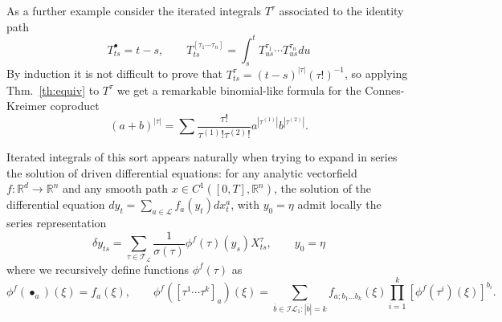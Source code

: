 \documentclass[a4paper]{article}
\newcommand{\ol}[1]{\overline{#1}}
\newcommand{\1}{{\bf 1}}
\newcommand{\II}{\mathcal{I}}
\newcommand{\der}{\delta}
\newcommand{\RR}{\mathbb{R}}
\newcommand{\FF}{\mathcal{F}}
\newcommand{\LL}{\mathcal{L}}
\newcommand{\TT}{\mathcal{T}}
\newcommand{\troot}{\bullet}
\newcommand{\RR}{\mathbb{R}}
\newcommand{\der}{\delta}
\begin{document}
As a further example
consider the iterated integrals $T^\tau$ associated to the identity path 
$$
T^{\troot}_{ts} = t-s, \qquad T^{[\tau_1 \cdots \tau_n]}_{ts} = \int_s^t T^{\tau_1}_{us}\cdots T^{\tau_n}_{us} du
$$  
By induction it is not difficult to prove that
$
T^{\tau}_{ts} = (t-s)^{|\tau|} (\tau!)^{-1}
$,  so applying Thm.~\ref{th:equiv} to $T^\tau$ we get a remarkable
binomial-like formula for the Connes-Kreimer coproduct
\begin{equation}
  \label{eq:tree-binomial}
  (a+b)^{|\tau|} = \sum  \frac{\tau!}{\tau^{(1)}! \tau^{(2)}!}
  a^{|\tau^{(1)}|} b^{|\tau^{(2)}|} .
\end{equation}

\bigskip
Iterated integrals of this sort appears naturally when trying to expand in series the solution of driven differential equations:
for any analytic vectorfield $f : \RR^d \to \RR^n$ and any smooth path
$x \in C^1([0,T],\RR^n)$, the solution of the differential equation
$
 dy_t = \sum_{a\in\LL}  f_a(y_t) dx_t^a$, with $y_0 = \eta
$  
admit locally the series representation
\begin{equation}
\label{eq:tree-rep}
\der y_{ts} = \sum_{\tau \in \TT_\LL} \frac{1}{\sigma(\tau)} \phi^{f}(\tau)(y_s) X^\tau_{ts}, \qquad y_0 = \eta
\end{equation}
where   we recursively define
functions $\phi^f(\tau)$ as
\begin{equation*}
\phi^f(\troot_a)(\xi) = f_a(\xi), \qquad
\phi^f([\tau^1 \cdots \tau^k]_a)(\xi) =  \sum_{\ol b  \in \II \LL_1: |\ol b| = k}
f_{a;b_1\dots b_k}(\xi) \prod_{i=1}^{k} [\phi^{f}(\tau^i)(\xi)]^{b_i}  .
\end{equation*}
%

\bigskip
\end{document}
